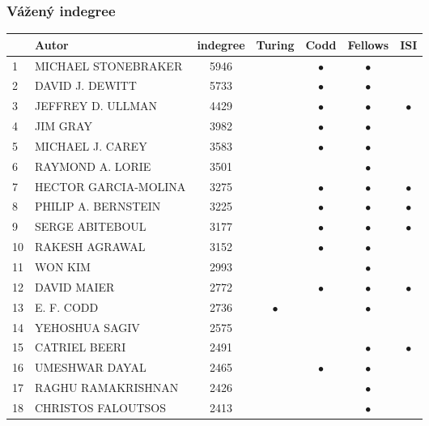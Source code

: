\documentclass[12pt,titlepage]{report}
\begin{document}
\subsubsection{Vážený indegree}
\begin{center}
\begin{tabular}{|l|l|c|c|c|c|c|}
\hline
& {\bf Autor} & {\bf indegree} & {\bf Turing} & {\bf Codd} & {\bf Fellows} & {\bf ISI} \\
\hline
1  & MICHAEL STONEBRAKER & 5946    &         &$\bullet$&$\bullet$&         \\
\hline
2  & DAVID J. DEWITT & 5733        &         &$\bullet$&$\bullet$&         \\
\hline
3  & JEFFREY D. ULLMAN & 4429      &         &$\bullet$&$\bullet$&$\bullet$\\
\hline
4  & JIM GRAY & 3982               &         &$\bullet$&$\bullet$&         \\
\hline
5  & MICHAEL J. CAREY & 3583       &         &$\bullet$&$\bullet$&         \\
\hline
6  & RAYMOND A. LORIE & 3501       &         &         &$\bullet$&         \\
\hline
7  & HECTOR GARCIA-MOLINA & 3275   &         &$\bullet$&$\bullet$&$\bullet$\\
\hline
8  & PHILIP A. BERNSTEIN & 3225    &         &$\bullet$&$\bullet$&$\bullet$\\
\hline
9  & SERGE ABITEBOUL & 3177        &         &$\bullet$&$\bullet$&$\bullet$\\
\hline
10 & RAKESH AGRAWAL & 3152         &         &$\bullet$&$\bullet$&         \\
\hline
11 & WON KIM & 2993                &         &         &$\bullet$&         \\
\hline
12 & DAVID MAIER & 2772            &         &$\bullet$&$\bullet$&$\bullet$\\
\hline
13 & E. F. CODD & 2736             &$\bullet$&         &$\bullet$&         \\
\hline
14 & YEHOSHUA SAGIV & 2575         &         &         &         &         \\
\hline
15 & CATRIEL BEERI & 2491          &         &         &$\bullet$&$\bullet$\\
\hline
16 & UMESHWAR DAYAL & 2465         &         &$\bullet$&$\bullet$&         \\
\hline
17 & RAGHU RAMAKRISHNAN & 2426     &         &         &$\bullet$&         \\
\hline
18 & CHRISTOS FALOUTSOS & 2413     &         &         &$\bullet$&         \\

\end{tabular}
\end{center}
\end{document}
